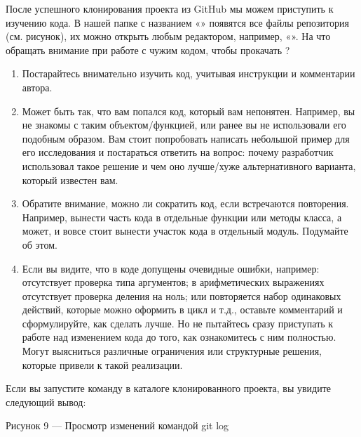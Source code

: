\documentclass[letterpaper,10pt,russian]{sphinxmanual}
\begin{document}
\sphinxAtStartPar
После успешного клонирования проекта из GitHub мы можем приступить к изучению кода. В нашей папке с названием «» появятся все файлы репозитория (см. рисунок), их можно открыть любым редактором, например, «». На что обращать внимание при работе с чужим кодом, чтобы прокачать ?
\begin{enumerate}
%
\item {} 
\sphinxAtStartPar
Постарайтесь внимательно изучить код, учитывая инструкции и комментарии автора.

\item {} 
\sphinxAtStartPar
Может быть так, что вам попался код, который вам непонятен. Например, вы не знакомы с таким объектом/функцией, или ранее вы не использовали его подобным образом. Вам стоит попробовать написать небольшой пример для его исследования и постараться ответить на вопрос: почему разработчик использовал такое решение и чем оно лучше/хуже альтернативного варианта, который известен вам.

\item {} 
\sphinxAtStartPar
Обратите внимание, можно ли сократить код, если встречаются повторения. Например, вынести часть кода в отдельные функции или методы класса, а может, и вовсе стоит вынести участок кода в отдельный модуль. Подумайте об этом.

\item {} 
\sphinxAtStartPar
Если вы видите, что в коде допущены очевидные ошибки, например: отсутствует проверка типа аргументов; в арифметических выражениях отсутствует проверка деления на ноль; или повторяется набор одинаковых действий, которые можно оформить в цикл и т.д., оставьте комментарий и сформулируйте, как сделать лучше. Но не пытайтесь сразу приступать к работе над изменением кода до того, как ознакомитесь с ним полностью. Могут выясниться различные ограничения или структурные решения, которые привели к такой реализации.

\end{enumerate}

\sphinxAtStartPar
Если вы запустите команду  в каталоге клонированного проекта, вы увидите следующий вывод:

\sphinxAtStartPar
{}

\sphinxAtStartPar
Рисунок 9 — Просмотр изменений командой git log
\end{document}
